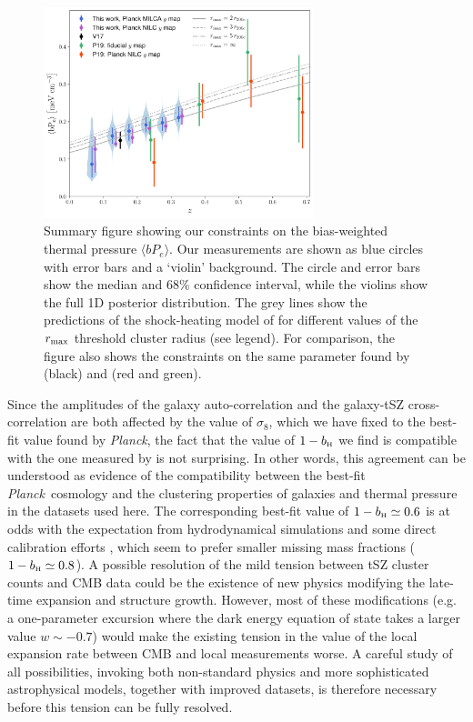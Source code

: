 \documentclass[useAMS,usenatbib]{mn2e}
\def\bH{b_{\scriptscriptstyle\rm H}}
\def\planck{{\it Planck\/}}
\begin{document}
      \begin{figure}
        \centering
        \includegraphics[width=0.7\textwidth]{by.pdf}
        \caption{Summary figure showing our constraints on the bias-weighted thermal pressure $\langle bP_e\rangle$. Our measurements are shown as blue circles with error bars and a `violin' background. The circle and error bars show the median and 68\% confidence interval, while the violins show the full 1D posterior distribution. The grey lines show the predictions of the shock-heating model of \citet{2012ApJ...758...75B} for different values of the $r_{\rm max}$ threshold cluster radius (see legend). For comparison, the figure also shows the constraints on the same parameter found by \citet{2017MNRAS.467.2315V} (black) and \citet{2019arXiv190413347P} (red and green).}
        \label{fig:by}
      \end{figure}
      
      Since the amplitudes of the galaxy auto-correlation and the galaxy-tSZ cross-correlation are both affected by the value of $\sigma_8$, which we have fixed to the best-fit value found by \planck, the fact that the value of $1-\bH$ we find is compatible with the one measured by \cite{2016A&A...594A..24P} is not surprising. In other words, this agreement can be understood as evidence of the compatibility between the best-fit \planck\ cosmology and the clustering properties of galaxies and thermal pressure in the datasets used here. The corresponding best-fit value of $1-\bH\simeq0.6$ is at odds with the expectation from hydrodynamical simulations \citep{2016ApJ...827..112B} and some direct calibration efforts \citep[e.g.][]{2016MNRAS.456L..74S,2019A&A...621A..40E}, which seem to prefer smaller missing mass fractions ($1-\bH\simeq0.8$). A possible resolution of the mild tension between tSZ cluster counts and CMB data could be the existence of new physics modifying the late-time expansion and structure growth. However, most of these modifications (e.g. a one-parameter excursion where the dark energy equation of state takes a larger value $w\sim-0.7$) would make the existing tension in the value of the local expansion rate between CMB and local measurements \citep{2019ApJ...876...85R} worse. A careful study of all possibilities, invoking both non-standard physics and more sophisticated astrophysical models, together with improved datasets, is therefore necessary before this tension can be fully resolved.
\end{document}
